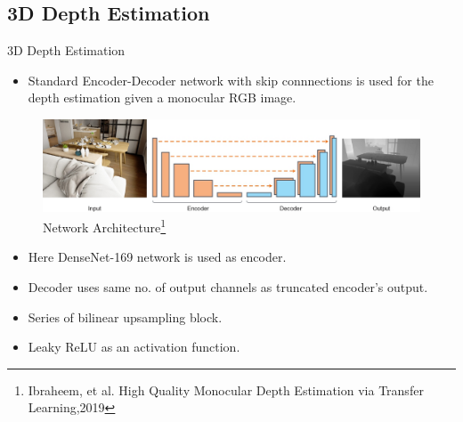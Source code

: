 \documentclass[10pt]{beamer}
\begin{document}
\subsection*{3D Depth Estimation}
\begin{frame}{3D Depth Estimation}
    \begin{itemize}
        \item Standard Encoder-Decoder network with skip connnections is used for the depth estimation given a monocular RGB image.
    \end{itemize}
    \pause
    \begin{figure}[!ht]
        \centering
        \includegraphics[scale=0.60]{monocular_depth.jpg}
        \caption{Network Architecture\footnote{Ibraheem, et al. High Quality Monocular Depth Estimation via Transfer Learning,2019}}
        \label{fig:net_archi}
    \end{figure}
    \pause
    \vspace{-0.5cm}
    \begin{itemize}
        \item Here DenseNet-169 network is used as encoder.
        \item Decoder uses same no. of output channels as truncated encoder's output.
        \item Series of bilinear upsampling block.
        \item Leaky ReLU as an activation function.
    \end{itemize}
\end{frame}
\end{document}
